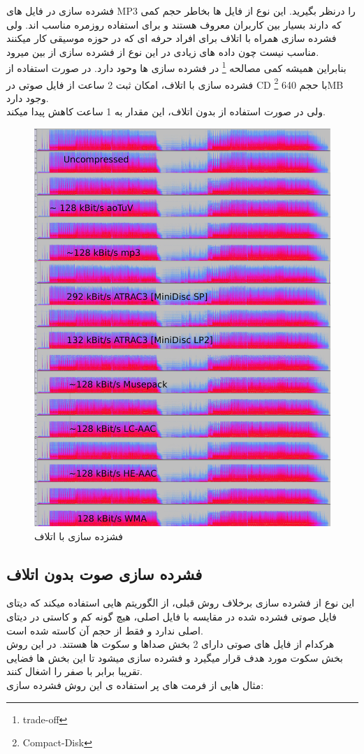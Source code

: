فشرده سازی در فایل های MP3 را درنظر بگیرید.
این نوع از فایل ها بخاطر حجم کمی که دارند
بسیار بین کاربران معروف هستند و برای استفاده روزمره مناسب اند.
ولی فشرده سازی همراه با اتلاف برای افراد حرفه ای که در حوزه موسیقی کار میکنند
مناسب نیست چون داده های زیادی در این نوع از فشرده سازی از بین میرود.
\\
بنابراین همیشه کمی مصالحه 
\footnote{trade-off}
در فشرده سازی ها وحود دارد.
در صورت استفاده از فشرده سازی با اتلاف، امکان ثبت 
2 ساعت از 
فایل صوتی در 
CD
\footnote{Compact-Disk}
با حجم 
640MB
وجود دارد.
\\
ولی در صورت استفاده از بدون اتلاف،
این مقدار به 1 ساعت کاهش پیدا میکند.
\newline
\begin{figure}[H]
    \centering
    \includegraphics[width=0.4\linewidth]{images/Lossy.jpg}
    \caption{فشزده سازی با اتلاف}
    \label{fig:mesal2}
\end{figure}

\subsection{فشرده سازی صوت بدون اتلاف}
این نوع از فشرده سازی برخلاف روش قبلی، از الگوریتم هایی استفاده میکند که 
دیتای فایل صوتی فشرده شده در مقایسه با فایل اصلی، 
هیچ گونه کم و کاستی در دیتای اصلی ندارد و فقط از حجم آن کاسته شده است.
\\
هرکدام از فایل های صوتی دارای 2 بخش صداها و سکوت ها هستند.
در این روش بخش سکوت مورد هدف قرار میگیرد و فشرده سازی میشود تا این بخش ها فضایی تقریبا برابر با صفر را اشغال کنند.
\\
مثال هایی از فرمت های پر استفاده ی این روش فشرده سازی:


